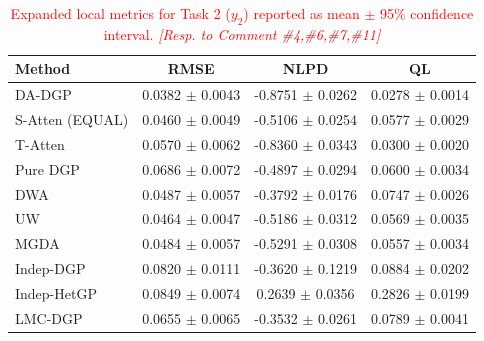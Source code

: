 \documentclass[11pt]{article}
\begin{document}
	\begin{table}[htbp]
		\centering
		\caption{\textcolor{red}{Expanded local metrics for Task 2 ($y_2$) reported as mean $\pm$ 95\% confidence interval. \textit{[Resp. to Comment \#4,\#6,\#7,\#11]}}}
		\label{tab:supp_task2_stats}
		{\color{red}\small
		\begin{tabular*}{\textwidth}{@{\extracolsep{\fill}}lccc}
			\toprule
			\textbf{Method} & \textbf{RMSE} & \textbf{NLPD} & \textbf{QL} \\
			\midrule
			DA-DGP & 0.0382 $\pm$ 0.0043 & -0.8751 $\pm$ 0.0262 & 0.0278 $\pm$ 0.0014 \\
			S-Atten (EQUAL) & 0.0460 $\pm$ 0.0049 & -0.5106 $\pm$ 0.0254 & 0.0577 $\pm$ 0.0029 \\
			T-Atten & 0.0570 $\pm$ 0.0062 & -0.8360 $\pm$ 0.0343 & 0.0300 $\pm$ 0.0020 \\
			Pure DGP & 0.0686 $\pm$ 0.0072 & -0.4897 $\pm$ 0.0294 & 0.0600 $\pm$ 0.0034 \\
			DWA & 0.0487 $\pm$ 0.0057 & -0.3792 $\pm$ 0.0176 & 0.0747 $\pm$ 0.0026 \\
			UW & 0.0464 $\pm$ 0.0047 & -0.5186 $\pm$ 0.0312 & 0.0569 $\pm$ 0.0035 \\
			MGDA & 0.0484 $\pm$ 0.0057 & -0.5291 $\pm$ 0.0308 & 0.0557 $\pm$ 0.0034 \\
			Indep-DGP & 0.0820 $\pm$ 0.0111 & -0.3620 $\pm$ 0.1219 & 0.0884 $\pm$ 0.0202 \\
			Indep-HetGP & 0.0849 $\pm$ 0.0074 & 0.2639 $\pm$ 0.0356 & 0.2826 $\pm$ 0.0199 \\
			LMC-DGP & 0.0655 $\pm$ 0.0065 & -0.3532 $\pm$ 0.0261 & 0.0789 $\pm$ 0.0041 \\
			\bottomrule
		\end{tabular*}
		}
	\end{table}
	
\end{document}
